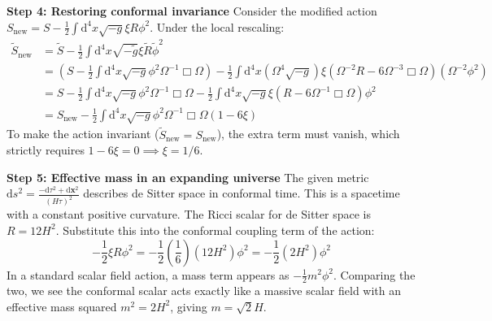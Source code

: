 \begin{solution}
\textbf{Step 4: Restoring conformal invariance}
Consider the modified action $S_{\text{new}} = S - \frac{1}{2} \int \mathrm{d}^4 x \sqrt{-g} \xi R \phi^2$.
Under the local rescaling:
\[ \begin{aligned}
    \tilde{S}_{\text{new}} &= \tilde{S} - \frac{1}{2} \int \mathrm{d}^4 x \sqrt{-\tilde{g}} \xi \tilde{R} \tilde{\phi}^2 \\
                           &= \left( S - \frac{1}{2} \int \mathrm{d}^4 x \sqrt{-g} \phi^2 \Omega^{-1} \Box \Omega \right) - \frac{1}{2} \int \mathrm{d}^4 x (\Omega^4 \sqrt{-g}) \xi (\Omega^{-2} R - 6 \Omega^{-3} \Box \Omega) (\Omega^{-2} \phi^2) \\
                           &= S - \frac{1}{2} \int \mathrm{d}^4 x \sqrt{-g} \phi^2 \Omega^{-1} \Box \Omega - \frac{1}{2} \int \mathrm{d}^4 x \sqrt{-g} \xi (R - 6 \Omega^{-1} \Box \Omega) \phi^2 \\
                           &= S_{\text{new}} - \frac{1}{2} \int \mathrm{d}^4 x \sqrt{-g} \phi^2 \Omega^{-1} \Box \Omega (1 - 6\xi)
\end{aligned} \]
To make the action invariant ($\tilde{S}_{\text{new}} = S_{\text{new}}$), the extra term must vanish, which strictly requires $1 - 6\xi = 0 \implies \xi = 1/6$.

\textbf{Step 5: Effective mass in an expanding universe}
The given metric $\mathrm{d}s^2 = \frac{-\mathrm{d}\tau^2 + \mathrm{d}\mathbf{x}^2}{(H\tau)^2}$ describes de Sitter space in conformal time. This is a spacetime with a constant positive curvature.
The Ricci scalar for de Sitter space is $R = 12H^2$.
Substitute this into the conformal coupling term of the action:
\[ - \frac{1}{2} \xi R \phi^2 = - \frac{1}{2} \left(\frac{1}{6}\right) (12H^2) \phi^2 = - \frac{1}{2} (2H^2) \phi^2 \]
In a standard scalar field action, a mass term appears as $- \frac{1}{2} m^2 \phi^2$.
Comparing the two, we see the conformal scalar acts exactly like a massive scalar field with an effective mass squared $m^2 = 2H^2$, giving $m = \sqrt{2} H$.
\end{solution}
